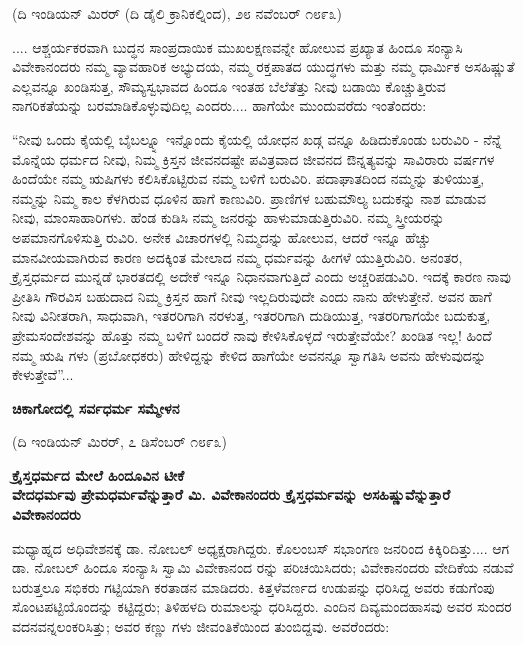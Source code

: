 \begin{center}
(ದಿ ಇಂಡಿಯನ್ ಮಿರರ್ (ದಿ ಡೈಲಿ ಕ್ರಾನಿಕಲ್ನಿಂದ), ೨೮ ನವೆಂಬರ್ ೧೮೯೩)
\end{center}

.... ಆಶ್ಚರ್ಯಕರವಾಗಿ ಬುದ್ಧನ ಸಾಂಪ್ರದಾಯಿಕ ಮುಖಲಕ್ಷಣವನ್ನೇ ಹೋಲುವ ಪ್ರಖ್ಯಾತ ಹಿಂದೂ ಸಂನ್ಯಾಸಿ ವಿವೇಕಾನಂದರು ನಮ್ಮ ವ್ಯಾವಹಾರಿಕ ಅಭ್ಯುದಯ, ನಮ್ಮ ರಕ್ತಪಾತದ ಯುದ್ಧಗಳು ಮತ್ತು ನಮ್ಮ ಧಾರ್ಮಿಕ ಅಸಹಿಷ್ಣುತೆ ಎಲ್ಲವನ್ನೂ ಖಂಡಿಸುತ್ತ, ಸೌಮ್ಯಸ್ವಭಾವದ ಹಿಂದೂ ಇಂತಹ ಬೆಲೆತೆತ್ತು ನೀವು ಬಡಾಯಿ ಕೊಚ್ಚುತ್ತಿರುವ ನಾಗರಿಕತೆಯನ್ನು ಬರಮಾಡಿಕೊಳ್ಳುವುದಿಲ್ಲ ಎಂದರು.... ಹಾಗೆಯೇ ಮುಂದುವರೆದು ಇಂತೆಂದರು:

“ನೀವು ಒಂದು ಕೈಯಲ್ಲಿ ಬೈಬಲ್ನ್ನೂ ಇನ್ನೊಂದು ಕೈಯಲ್ಲಿ ಯೋಧನ ಖಡ್ಗ ವನ್ನೂ ಹಿಡಿದುಕೊಂಡು ಬರುವಿರಿ - ನೆನ್ನೆ ಮೊನ್ನೆಯ ಧರ್ಮದ ನೀವು, ನಿಮ್ಮ ಕ್ರಿಸ್ತನ ಜೀವನದಷ್ಟೇ ಪವಿತ್ರವಾದ ಜೀವನದ ಔನ್ನತ್ಯವನ್ನು ಸಾವಿರಾರು ವರ್ಷಗಳ ಹಿಂದೆಯೇ ನಮ್ಮ ಋಷಿಗಳು ಕಲಿಸಿಕೊಟ್ಟಿರುವ ನಮ್ಮ ಬಳಿಗೆ ಬರುವಿರಿ. ಪದಾಘಾತದಿಂದ ನಮ್ಮನ್ನು ತುಳಿಯುತ್ತ, ನಮ್ಮನ್ನು ನಿಮ್ಮ ಕಾಲ ಕೆಳಗಿರುವ ಧೂಳಿನ ಹಾಗೆ ಕಾಣುವಿರಿ. ಪ್ರಾಣಿಗಳ ಬಹುಮೌಲ್ಯ ಬದುಕನ್ನು ನಾಶ ಮಾಡುವ ನೀವು, ಮಾಂಸಾಹಾರಿಗಳು. ಹೆಂಡ ಕುಡಿಸಿ ನಮ್ಮ ಜನರನ್ನು ಹಾಳುಮಾಡುತ್ತಿರುವಿರಿ. ನಮ್ಮ ಸ್ತ್ರೀಯರನ್ನು ಅಪಮಾನಗೊಳಿಸುತ್ತಿ ರುವಿರಿ. ಅನೇಕ ವಿಚಾರಗಳಲ್ಲಿ ನಿಮ್ಮದನ್ನು ಹೋಲುವ, ಆದರೆ ಇನ್ನೂ ಹೆಚ್ಚು ಮಾನವೀಯವಾಗಿರುವ ಕಾರಣ ಅದಕ್ಕಿಂತ ಮೇಲಾದ ನಮ್ಮ ಧರ್ಮವನ್ನು ಹೀಗಳೆ ಯುತ್ತಿರುವಿರಿ. ಅನಂತರ, ಕ್ರೈಸ್ತಧರ್ಮದ ಮುನ್ನಡೆ ಭಾರತದಲ್ಲಿ ಅದೇಕೆ ಇನ್ನೂ ನಿಧಾನವಾಗುತ್ತಿದೆ ಎಂದು ಅಚ್ಚರಿಪಡುವಿರಿ. ಇದಕ್ಕೆ ಕಾರಣ ನಾವು ಪ್ರೀತಿಸಿ ಗೌರವಿಸ ಬಹುದಾದ ನಿಮ್ಮ ಕ್ರಿಸ್ತನ ಹಾಗೆ ನೀವು ಇಲ್ಲದಿರುವುದೇ ಎಂದು ನಾನು ಹೇಳುತ್ತೇನೆ. ಅವನ ಹಾಗೆ ನೀವು ವಿನೀತರಾಗಿ, ಸಾಧುವಾಗಿ, ಇತರರಿಗಾಗಿ ನರಳುತ್ತ, ಇತರರಿಗಾಗಿ ದುಡಿಯುತ್ತ, ಇತರರಿಗಾಗಯೇ ಬದುಕುತ್ತ, ಪ್ರೇಮಸಂದೇಶವನ್ನು ಹೊತ್ತು ನಮ್ಮ ಬಳಿಗೆ ಬಂದರೆ ನಾವು ಕೇಳಿಸಿಕೊಳ್ಳದೆ ಇರುತ್ತೇವೆಯೇ? ಖಂಡಿತ ಇಲ್ಲ! ಹಿಂದೆ ನಮ್ಮ ಋಷಿ ಗಳು (ಪ್ರಬೋಧಕರು) ಹೇಳಿದ್ದನ್ನು ಕೇಳಿದ ಹಾಗೆಯೇ ಅವನನ್ನೂ ಸ್ವಾಗತಿಸಿ ಅವನು ಹೇಳುವುದನ್ನು ಕೇಳುತ್ತೇವೆ”...

\begin{center}
\textbf{ಚಿಕಾಗೋದಲ್ಲಿ ಸರ್ವಧರ್ಮ ಸಮ್ಮೇಳನ}
\end{center}

\begin{center}
(ದಿ ಇಂಡಿಯನ್ ಮಿರರ್, ೭ ಡಿಸೆಂಬರ್ ೧೮೯೩)
\end{center}

\begin{center}
\textbf{ಕ್ರೈಸ್ತಧರ್ಮದ ಮೇಲೆ ಹಿಂದೂವಿನ ಟೀಕೆ\\ವೇದಧರ್ಮವು ಪ್ರೇಮಧರ್ಮವೆನ್ನುತ್ತಾರೆ ಮಿ. ವಿವೇಕಾನಂದರು ಕ್ರೈಸ್ತಧರ್ಮವನ್ನು ಅಸಹಿಷ್ಣುವೆನ್ನುತ್ತಾರೆ ವಿವೇಕಾನಂದರು}
\end{center}

ಮಧ್ಯಾಹ್ನದ ಅಧಿವೇಶನಕ್ಕೆ ಡಾ. ನೋಬಲ್ ಅಧ್ಯಕ್ಷರಾಗಿದ್ದರು. ಕೊಲಂಬಸ್ ಸಭಾಂಗಣ ಜನರಿಂದ ಕಿಕ್ಕಿರಿದಿತ್ತು.... ಆಗ ಡಾ. ನೋಬಲ್ ಹಿಂದೂ ಸಂನ್ಯಾಸಿ ಸ್ವಾಮಿ ವಿವೇಕಾನಂದ ರನ್ನು ಪರಿಚಯಿಸಿದರು; ವಿವೇಕಾನಂದರು ವೇದಿಕೆಯ ನಡುವೆ ಬರುತ್ತಲೂ ಸಭಿಕರು ಗಟ್ಟಿಯಾಗಿ ಕರತಾಡನ ಮಾಡಿದರು. ಕಿತ್ತಳೆವರ್ಣದ ಉಡುಪನ್ನು ಧರಿಸಿದ್ದ ಅವರು ಕಡುಗೆಂಪು ಸೊಂಟಪಟ್ಟಿಯೊಂದನ್ನು ಕಟ್ಟಿದ್ದರು; ತಿಳಿಹಳದಿ ರುಮಾಲನ್ನು ಧರಿಸಿದ್ದರು. ಎಂದಿನ ದಿವ್ಯಮಂದಹಾಸವು ಅವರ ಸುಂದರ ವದನವನ್ನಲಂಕರಿಸಿತ್ತು; ಅವರ ಕಣ್ಣು ಗಳು ಜೀವಂತಿಕೆಯಿಂದ ತುಂಬಿದ್ದವು. ಅವರೆಂದರು:

